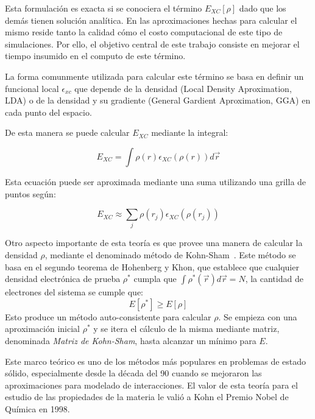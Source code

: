 Esta formulaci\'on es exacta si se conociera el t\'ermino $E_{XC}[\rho]$ dado que los dem\'as tienen soluci\'on anal\'itica. 
En las aproximaciones hechas para calcular el mismo reside tanto la calidad c\'omo el costo computacional de este tipo de simulaciones. 
Por ello, el objetivo central de este trabajo consiste en mejorar el tiempo insumido en el computo de este t\'ermino.

La forma comunmente utilizada para calcular este t\'ermino se basa en definir un funcional local $\epsilon_{xc}$ que depende de la densidad (Local Density Aproximation, LDA) o de la densidad y su gradiente (General Gardient Aproximation, GGA) en cada punto del espacio.

De esta manera se puede calcular $E_{XC}$ mediante la integral:

\begin{equation}
  E_{XC} = \int \rho(r) \epsilon_{XC}\left( \rho(r) \right ) d\vec{r}
\end{equation}

Esta ecuaci\'on puede ser aproximada mediante una suma utilizando una grilla de puntos seg\'un:

\begin{equation}
    \label{eq:xc}
    E_{XC} \approx \sum_j \rho(r_j) \epsilon_{XC} (\rho(r_j))
\end{equation}

Otro aspecto importante de esta teor\'ia es que provee una manera de calcular la densidad $\rho$, mediante el denominado m\'etodo de Kohn-Sham~\cite{KohnSham}.
Este m\'etodo se basa en el segundo teorema de Hohenberg y Khon, que establece que cualquier densidad electr\'onica de prueba $\rho^*$ cumpla que $\int \rho^*(\vec{r}) d\vec{r} = N$, la cantidad de electrones del sistema
se cumple que:
\begin{equation}
    \label{princ_variacional}
    E[\rho^*] \geq E[\rho]
\end{equation}
Esto produce un m\'etodo auto-consistente para calcular $\rho$. 
Se empieza con una aproximaci\'on inicial $\rho^*$ y se itera el c\'alculo de la misma mediante matriz, denominada \textit{Matriz de Kohn-Sham}, hasta alcanzar un m\'inimo para $E$.

Este marco te\'orico es uno de los m\'etodos m\'as populares en problemas de estado s\'olido, especialmente desde la d\'ecada del 90 cuando se mejoraron las aproximaciones para modelado de interacciones.
El valor de esta teor\'ia para el estudio de las propiedades de la materia le vali\'o a Kohn el Premio Nobel de Qu\'imica en 1998.

